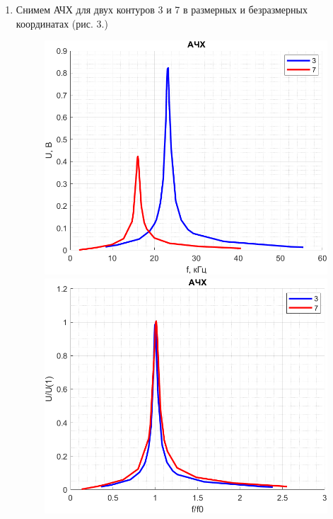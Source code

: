 \documentclass[a4paper,12pt]{article}
\begin{document}
\begin{enumerate}
\begin{equation}
\begin{array}{lllllll}
\rho = \sqrt{\frac{L}{C}} & , & Z_\text{рез} = \frac{U}{I_0} = \frac{UR_1}{E} & , & Q = \frac{Z_\text{рез}}{\rho} & , \\
R_\Sigma = \frac{Z_\text{рез}}{Q^2} & , & R_{S \max} = \tg \frac{\delta}{\omega C} & , & R_L = R_\Sigma - R - R_s & . \\

\end{array}
\end{equation}

\item Снимем АЧХ для двух контуров 3 и 7 в размерных и безразмерных координатах (рис. 3.)

\begin{figure}[h]
\centering
\begin{minipage}[h]{0.49\textwidth}
\includegraphics[width=\textwidth]{afc_1.png}
\end{minipage}
\begin{minipage}[h]{0.49\textwidth}
\includegraphics[width=\textwidth]{afc_2.png}

\end{minipage}
\end{figure}
\end{enumerate}
\end{document}
